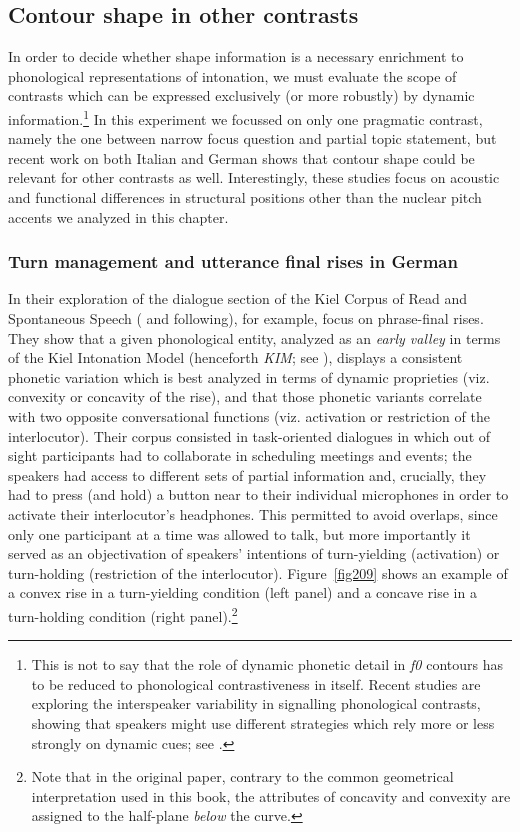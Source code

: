 \subsection{Contour shape in other contrasts}\label{sec241}
In order to decide whether shape information is a necessary enrichment to phonological representations of intonation, we must evaluate the scope of contrasts which can be expressed exclusively (or more robustly) by dynamic information.\footnote{This is not to say that the role of dynamic phonetic detail in \textit{f0} contours has to be reduced to phonological contrastiveness in itself. Recent studies are exploring the interspeaker variability in signalling phonological contrasts, showing that speakers might use different strategies which rely more or less strongly on dynamic cues; see \citet{niebuhr2011shapers}.} In this experiment we focussed on only one pragmatic contrast, namely the one between narrow focus question and partial topic statement, but recent work on both Italian \citep{dimperio2000role,petrone2008tonal} and German \citep{dombrowski2005acoustic,petrone2014intonation} shows that contour shape could be relevant for other contrasts as well. Interestingly, these studies focus on acoustic and functional differences in structural positions other than the nuclear pitch accents we analyzed in this chapter.

\subsubsection{Turn management and utterance final rises in German}\label{sec2411}
In their exploration of the dialogue section of the Kiel Corpus of Read and Spontaneous Speech (\citealt{ipds1994kcrs} and following), for example, \citeauthor{dombrowski2005acoustic} focus on phrase-final rises. They show that a given phonological entity, analyzed as an \textit{early valley} in terms of the Kiel Intonation Model (henceforth \textit{KIM}; see \citealt{kohler1991model}), displays a consistent phonetic variation which is best analyzed in terms of dynamic proprieties (viz. convexity or concavity of the rise), and that those phonetic variants correlate with two opposite conversational functions (viz. activation or restriction of the interlocutor). Their corpus consisted in task-oriented dialogues in which out of sight participants had to collaborate in scheduling meetings and events; the speakers had access to different sets of partial information and, crucially, they had to press (and hold) a button near to their individual microphones in order to activate their interlocutor's headphones. This permitted to avoid overlaps, since only one participant at a time was allowed to talk, but more importantly it served as an objectivation of speakers' intentions of turn-yielding (activation) or turn-holding (restriction of the interlocutor). Figure~\ref{fig209} shows an example of a convex rise in a turn-yielding condition (left panel) and a concave rise in a turn-holding condition (right panel).\footnote{Note that in the original paper, contrary to the common geometrical interpretation used in this book, the attributes of concavity and convexity are assigned to the half-plane \textit{below} the curve.}

